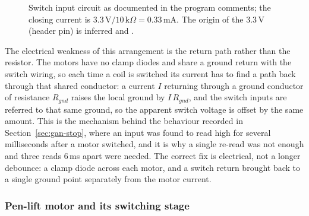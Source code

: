 \begin{figure}[!htbp]
\centering
{}
\caption{Switch input circuit as documented in the program comments; the closing current is $3.3\,\mathrm{V}/10\,\mathrm{k}\Omega=0.33$\,mA. The origin of the 3.3\,V (header pin) is inferred and .}
\label{fig:gan-switch}
\end{figure}

The electrical weakness of this arrangement is the return path rather than the resistor.
The motors have no clamp diodes and share a ground return with the switch wiring, so each time a coil is switched its current has to find a path back through that shared conductor: a current $I$ returning through a ground conductor of resistance $R_{gnd}$ raises the local ground by $I\,R_{gnd}$, and the switch inputs are referred to that same ground, so the apparent switch voltage is offset by the same amount.
This is the mechanism behind the behaviour recorded in Section~\ref{sec:gan-stop}, where an input was found to read high for several milliseconds after a motor switched, and it is why a single re-read was not enough and three reads 6\,ms apart were needed.
The correct fix is electrical, not a longer debounce: a clamp diode across each motor, and a switch return brought back to a single ground point separately from the motor current.


\subsubsection{Pen-lift motor and its switching stage}
\label{sec:gan-penckt}

